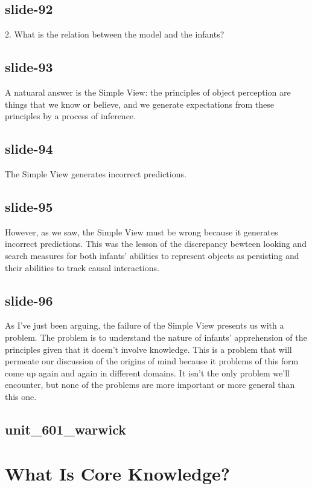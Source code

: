 \documentclass[12pt,\papersize]{extarticle}
\begin{document}
\subsection{slide-92}
2. What is the relation between the model and the infants?

\subsection{slide-93}
A natuaral answer is the Simple View: the principles of object perception are things that we know or believe, and we generate expectations from these principles by a process of inference.

\subsection{slide-94}
The Simple View generates incorrect predictions.

\subsection{slide-95}
However, as we saw, the Simple View must be wrong because it generates incorrect predictions.
This was the lesson of the discrepancy bewteen looking and search measures for both
infants' abilities to represent objects as persisting and their abilities to track causal
interactions.

\subsection{slide-96}
As I've just been arguing, the failure of the Simple View presents us with a problem.
The problem is to understand the nature of infants' apprehension of the principles given
that it doesn't involve knowledge.
This is a problem that will permeate our discussion of the origins of mind because it
problems of this form come up again and again in different domains.
It isn't the only problem we'll encounter, but none of the problems are more important or more
general than this one.

\subsection{unit\_601\_warwick}


\section{What Is Core Knowledge?}
\end{document}
